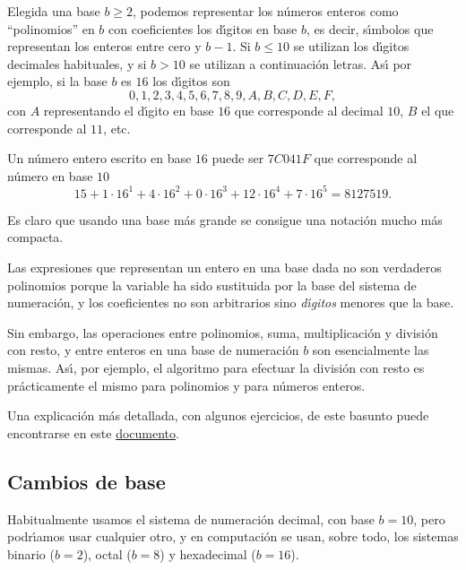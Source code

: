 Elegida una base $b\ge 2$, podemos representar los n\'umeros enteros como
``polinomios'' en $b$ con coeficientes los d\'{\i}gitos en base $b$, es decir,
s\'{\i}mbolos que representan los enteros entre cero y $b-1$. Si $b\le 10$ se
utilizan los d\'{\i}gitos decimales habituales, y si $b>10$ se utilizan a
continuaci\'on letras. As\'{\i} por ejemplo, si la base $b$ es $16$
los d\'{\i}gitos son 
\[0,1,2,3,4,5,6,7,8,9,A,B,C,D,E,F,\]
\noindent con $A$ representando el d\'{\i}gito en base $16$ que corresponde al
decimal  $10$, $B$ el que corresponde al $11$, etc.

Un n\'umero entero escrito en base $16$ puede ser $7C041F$ que corresponde al
n\'umero en base $10$
\[15+1\cdot 16^1+4\cdot 16^2+0\cdot 16^3+12\cdot 16^4+7\cdot 16^5=8127519.\]

Es claro que usando una base m\'as grande se consigue una notaci\'on mucho m\'as
compacta. 

Las expresiones que representan un entero en una base dada no son
verdaderos polinomios porque la variable ha sido sustituida por la base del
sistema de numeraci\'on,  y los coeficientes no son arbitrarios sino {\itshape
d\'{\i}gitos} menores que la base.

Sin embargo, las operaciones entre polinomios, suma, multiplicaci\'on y
divisi\'on con resto,  y entre enteros en una base de numeraci\'on $b$ son  
esencialmente las mismas. As\'{\i}, por ejemplo, el algoritmo para efectuar la
divisi\'on con resto es pr\'acticamente el mismo para polinomios y para
n\'umeros enteros. 

Una explicaci\'on m\'as detallada, con algunos ejercicios, de este basunto puede encontrarse en este
\href{http://150.244.21.37/PDFs/COMPL/StmasNumeracion.pdf}{documento}.

\subsection{Cambios de base}
Habitualmente usamos el sistema de numeraci\'on decimal, con base $b=10$, pero
podr\'{\i}amos usar cualquier otro, y en computaci\'on se usan, sobre todo, los
sistemas binario ($b=2$), octal ($b=8$) y hexadecimal ($b=16$).


